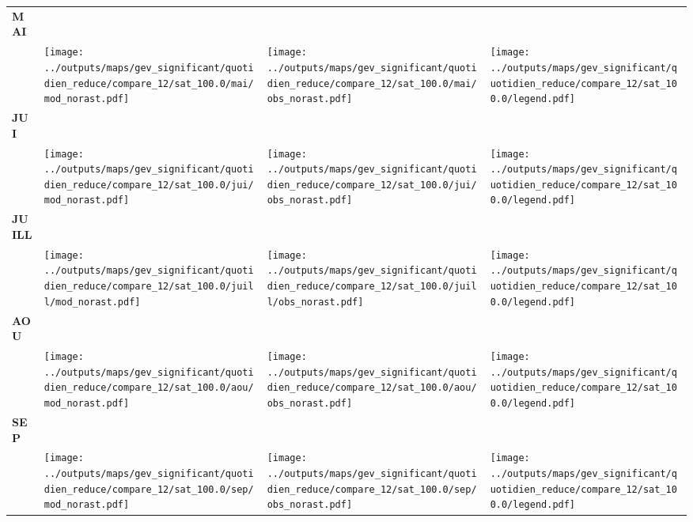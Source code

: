 \documentclass[
  letterpaper,
  DIV=11,
  numbers=noendperiod]{scrartcl}
\begin{document}
\begin{longtable*}{m{2.0cm}m{7.9cm}m{7.9cm}m{1cm}}
\centering \textbf{MAI} \\[0.2em] \begin{tabular}{r@{\hspace{0.2em}}l}\end{tabular} & \centering \texttt{[image: ../outputs/maps/gev\_significant/quotidien\_reduce/compare\_12/sat\_100.0/mai/mod\_norast.pdf]} & \centering \texttt{[image: ../outputs/maps/gev\_significant/quotidien\_reduce/compare\_12/sat\_100.0/mai/obs\_norast.pdf]} & \centering \texttt{[image: ../outputs/maps/gev\_significant/quotidien\_reduce/compare\_12/sat\_100.0/legend.pdf]} \tabularnewline
\centering \textbf{JUI} \\[0.2em] \begin{tabular}{r@{\hspace{0.2em}}l}\end{tabular} & \centering \texttt{[image: ../outputs/maps/gev\_significant/quotidien\_reduce/compare\_12/sat\_100.0/jui/mod\_norast.pdf]} & \centering \texttt{[image: ../outputs/maps/gev\_significant/quotidien\_reduce/compare\_12/sat\_100.0/jui/obs\_norast.pdf]} & \centering \texttt{[image: ../outputs/maps/gev\_significant/quotidien\_reduce/compare\_12/sat\_100.0/legend.pdf]} \tabularnewline
\centering \textbf{JUILL} \\[0.2em] \begin{tabular}{r@{\hspace{0.2em}}l}\end{tabular} & \centering \texttt{[image: ../outputs/maps/gev\_significant/quotidien\_reduce/compare\_12/sat\_100.0/juill/mod\_norast.pdf]} & \centering \texttt{[image: ../outputs/maps/gev\_significant/quotidien\_reduce/compare\_12/sat\_100.0/juill/obs\_norast.pdf]} & \centering \texttt{[image: ../outputs/maps/gev\_significant/quotidien\_reduce/compare\_12/sat\_100.0/legend.pdf]} \tabularnewline
\centering \textbf{AOU} \\[0.2em] \begin{tabular}{r@{\hspace{0.2em}}l}\end{tabular} & \centering \texttt{[image: ../outputs/maps/gev\_significant/quotidien\_reduce/compare\_12/sat\_100.0/aou/mod\_norast.pdf]} & \centering \texttt{[image: ../outputs/maps/gev\_significant/quotidien\_reduce/compare\_12/sat\_100.0/aou/obs\_norast.pdf]} & \centering \texttt{[image: ../outputs/maps/gev\_significant/quotidien\_reduce/compare\_12/sat\_100.0/legend.pdf]} \tabularnewline
\centering \textbf{SEP} \\[0.2em] \begin{tabular}{r@{\hspace{0.2em}}l}\end{tabular} & \centering \texttt{[image: ../outputs/maps/gev\_significant/quotidien\_reduce/compare\_12/sat\_100.0/sep/mod\_norast.pdf]} & \centering \texttt{[image: ../outputs/maps/gev\_significant/quotidien\_reduce/compare\_12/sat\_100.0/sep/obs\_norast.pdf]} & \centering \texttt{[image: ../outputs/maps/gev\_significant/quotidien\_reduce/compare\_12/sat\_100.0/legend.pdf]} \tabularnewline

\end{longtable*}
\end{document}
